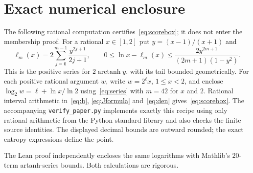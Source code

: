 \section{Exact numerical enclosure}\label{app:numerical}
The following rational computation certifies~\eqref{eq:scorebox}; it does
not enter the membership proof. For a rational $x\in[1,2]$ put
$y=(x-1)/(x+1)$ and
\begin{equation}\label{eq:series}
 \ell_m(x)=2\sum_{j=0}^{m-1}\frac{y^{2j+1}}{2j+1},\qquad
 0\le\ln x-\ell_m(x)\le
 \frac{2y^{2m+1}}{(2m+1)(1-y^2)}.
\end{equation}
This is the positive series for $2\operatorname{arctanh}y$, with its tail
bounded geometrically. For each positive rational argument $w$, write
$w=2^\ell x$, $1\le x<2$, and enclose
$\log_2w=\ell+\ln x/\ln2$ using~\eqref{eq:series} with $m=42$ for $x$
and $2$. Rational interval arithmetic in~\eqref{eq:b},
\eqref{eq:Jformula} and~\eqref{eq:den} gives~\eqref{eq:scorebox}.
The accompanying \texttt{verify\_paper.py} implements exactly this recipe
using only rational arithmetic from the Python standard library and also
checks the finite source identities. The displayed decimal bounds are
outward rounded; the exact entropy expressions define the point.

The Lean proof independently encloses the same logarithms with Mathlib's $20$-term artanh-series bounds. Both calculations are rigorous.
